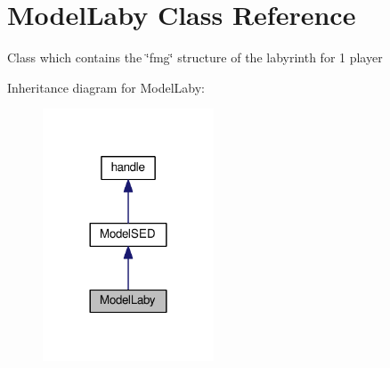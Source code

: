 \hypertarget{class_model_laby}{}\section{Model\+Laby Class Reference}
\label{class_model_laby}


Class which contains the \char`\"{}fmg\char`\"{} structure of the labyrinth for 1 player  




Inheritance diagram for Model\+Laby\+:\nopagebreak
\begin{figure}[H]
\begin{center}
\leavevmode
\includegraphics[width=144pt]{class_model_laby__inherit__graph}
\end{center}
\end{figure}
